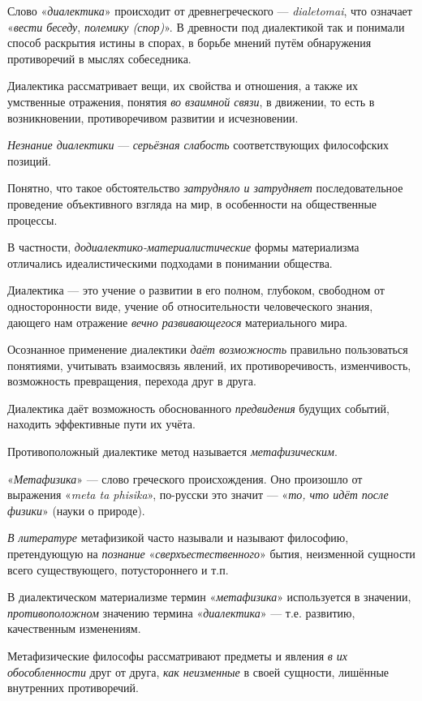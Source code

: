 \documentclass[a4paper,14pt,russian]{extreport}
\begin{document}
Слово «\emph{диалектика}» происходит от древнегреческого --- \emph{dialetomai}, что означает «\emph{вести беседу}, \emph{полемику (спор)}». В древности под диалектикой так и понимали способ раскрытия истины в спорах, в борьбе мнений путём обнаружения противоречий в мыслях собеседника.

Диалектика рассматривает вещи, их свойства и отношения, а также их умственные отражения, понятия \emph{во взаимной связи}, в движении, то есть в возникновении, противоречивом развитии и исчезновении.

\emph{Незнание диалектики} --- \emph{серьёзная слабость} соответствующих философских позиций.

Понятно, что такое обстоятельство \emph{затрудняло и затрудняет} последовательное проведение объективного взгляда на мир, в особенности на общественные процессы.

В частности, \emph{додиалектико-материалистические} формы материализма отличались идеалистическими подходами в понимании общества.

Диалектика --- это учение о развитии в его полном, глубоком, свободном от односторонности виде, учение об относительности человеческого знания, дающего нам отражение \emph{вечно развивающегося} материального мира.

Осознанное применение диалектики \emph{даёт возможность} правильно пользоваться понятиями, учитывать взаимосвязь явлений, их противоречивость, изменчивость, возможность превращения, перехода друг в друга.

Диалектика даёт возможность обоснованного \emph{предвидения} будущих событий, находить эффективные пути их учёта.

Противоположный диалектике метод называется \emph{метафизическим}.

«\emph{Метафизика}» --- слово греческого происхождения. Оно произошло от выражения «\emph{meta ta phisika}», по-русски это значит --- «\emph{то, что идёт после физики}» (науки о природе).

\emph{В литературе} метафизикой часто называли и называют философию, претендующую на \emph{познание} «\emph{сверхъестественного}» бытия, неизменной сущности всего существующего, потустороннего и т.п.

В диалектическом материализме термин «\emph{метафизика}» используется в значении, \emph{противоположном} значению термина «\emph{диалектика}» --- т.е. развитию, качественным изменениям.

Метафизические философы рассматривают предметы и явления \emph{в их обособленности} друг от друга, \emph{как неизменные} в своей сущности, лишённые внутренних противоречий.
\end{document}
